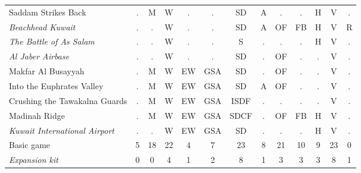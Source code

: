\documentclass[a4paper]{article}
\newenvironment{texte}{\rmfamily\footnotesize}{}
\begin{document}
\begin{texte}
\begin{tabular}{lcccccccccccc}
     Saddam Strikes Back                           & . &  M &  W &  . &  .  & SD    & A &  . &  . & H &  V & . \\
\it  Beachhead Kuwait                              & . &  . &  W &  . &  .  & SD    & A & OF & FB & H &  V & R \\
\it  The Battle of As Salam                        & . &  . &  W &  . &  .  & S     & . &  . &  . & H &  V & . \\
\it  Al Jaber Airbase                              & . &  . &  W &  . &  .  & SD    & . & OF &  . & . &  V & . \\
     Makfar Al Busayyah                            & . &  M &  W & EW & GSA & SD    & . & OF &  . & . &  V & . \\
     Into the Euphrates Valley                     & . &  M &  W & EW & GSA & SD    & A & OF &  . & . &  V & . \\
     Crushing the Tawakalna Guards                 & . &  M &  W & EW & GSA & ISDF  & . &  . &  . & . &  V & . \\
     Madinah Ridge                                 & . &  M &  W & EW & GSA & SDCF  & . & OF & FB & H &  V & . \\
\it  Kuwait International Airport                  & . &  . &  W & EW & GSA & SD    & . &  . &  . & H &  V & . \\
\hline
    Basic game                                     & 5 & 18 & 22 &  4 &  7  & 23 & 8 & 21 & 10 & 9 & 23 & 0 \\
\it Expansion kit                                  & 0 &  0 &  4 &  1 &  2  &  8 & 1 &  3 &  3 & 3 &  8 & 1 \\
\end{tabular}

\end{texte}
\end{document}

